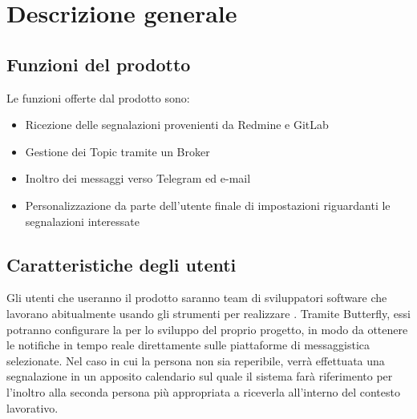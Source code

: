 \newpage
\section{Descrizione generale}\label{DescrizioneGenerale}

	
	\subsection{Funzioni del prodotto}
	
    Le funzioni offerte dal prodotto sono:
    \begin{itemize}
        \item Ricezione delle segnalazioni provenienti da Redmine e GitLab
        \item Gestione dei Topic tramite un Broker
        \item Inoltro dei messaggi verso Telegram ed e-mail
        \item Personalizzazione da parte dell'utente finale di impostazioni riguardanti le segnalazioni interessate
	\end{itemize}

	\subsection{Caratteristiche degli utenti}
    
    Gli utenti che useranno il prodotto saranno team di sviluppatori software che lavorano abitualmente usando gli strumenti per realizzare .
    Tramite Butterfly, essi potranno configurare la  per lo sviluppo del proprio progetto, in modo da ottenere le notifiche in tempo reale direttamente sulle piattaforme di messaggistica selezionate.
    Nel caso in cui la persona non sia reperibile, verrà effettuata una segnalazione in un apposito calendario sul quale il sistema farà riferimento per l'inoltro alla seconda persona più appropriata a riceverla all'interno del contesto lavorativo.
	
